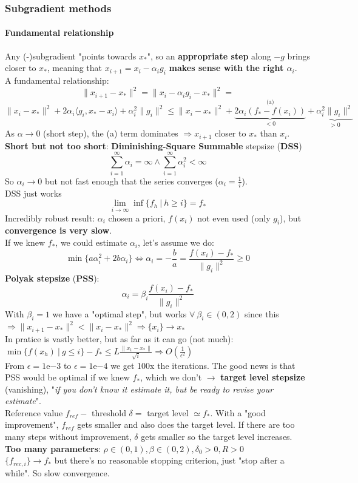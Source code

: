 \documentclass[10pt]{report}
\begin{document}
\subsubsection{Subgradient methods}
\paragraph{Fundamental relationship} Any (-)subgradient "points towards $x_*$", so an \textbf{appropriate step} along $-g$ brings closer to $x_*$, meaning that $x_{i+1} = x_i - \alpha_ig_i$ \textbf{makes sense with the right $\alpha_i$}.\\
A fundamental relationship: $$\|x_{i+1}-x_*\|^2 = \|x_i - \alpha_ig_i - x_*\|^2 =$$
$$\|x_i-x_*\|^2+2\alpha_i\langle g_i, x_*-x_i\rangle + \alpha_i^2\|g_i\|^2 \leq \|x_i - x_*\|^2 + \overset{\text{(a)}}{\underset{<0}{\underbrace{2\alpha_i(f_*-f(x_i))}}} + \underset{>0}{\underbrace{\alpha_i^2\|g_i\|^2}} $$
As $\alpha \rightarrow 0$ (short step), the (a) term dominates $\Rightarrow x_{i+1}$ closer to $x_*$ than $x_i$.\\
\textbf{Short but not too short}: \textbf{Diminishing-Square Summable} stepsize (\textbf{DSS}) $$\sum_{i=1}^\infty\alpha_i = \infty\wedge\sum_{i=1}^\infty\alpha_i^2<\infty$$
So $\alpha_i\rightarrow 0$ but not fast enough that the series converges ($\alpha_i = \frac{1}{i}$).\\
DSS just works $$\lim_{i\to\infty} \inf\{f_h\:|\:h\geq i\} = f_*$$
Incredibly robust result: $\alpha_i$ chosen a priori, $f(x_i)$ not even used (only $g_i$), but \textbf{convergence is very slow}.\\
If we knew $f_*$, we could estimate $\alpha_i$, let's assume we do: $$\min\{a\alpha_i^2+2b\alpha_i\}\Leftrightarrow \alpha_i = -\frac{b}{a} = \frac{f(x_i)-f_*}{\|g_i\|^2} \geq 0$$
\textbf{Polyak stepsize} (\textbf{PSS}): $$\alpha_i = \beta_i\frac{f(x_i)-f_*}{\|g_i\|^2}$$ With $\beta_i = 1$ we have a "optimal step", but works $\forall\:\beta_i\in(0,2)$ since this $\Rightarrow \|x_{i+1}-x_*\|^2 < \|x_i-x_*\|^2\Rightarrow \{x_i\}\rightarrow x_*$\\
In pratice is vastly better, but as far as it can go (not much): $\min\{f(x_h)\:|\:g\leq i\}-f_*\leq L\frac{\|x_1-x_*\|}{\sqrt{i}}\Rightarrow O\left(\frac{1}{\epsilon^2}\right)$\\
From $\epsilon=1$e$-3$ to $\epsilon=1$e$-4$ we get 100x the iterations. The good news is that PSS would be optimal if we knew $f_*$, which we don't $\rightarrow$ \textbf{target level stepsize} (vanishing), "\textit{if you don't know it estimate it, but be ready to revise your estimate}".\\
Reference value $f_{ref} -$ threshold $\delta =$ target level $\simeq f_*$. With a "good improvement", $f_{ref}$ gets smaller and also does the target level. If there are too many steps without improvement, $\delta$ gets smaller so the target level increases.\\
\textbf{Too many parameters}: $\rho\in(0,1),\beta\in(0,2),\delta_0>0,R>0$\\
$\{f_{rec,i}\}\rightarrow f_*$ but there's no reasonable stopping criterion, just "stop after a while". So slow convergence.
\end{document}
